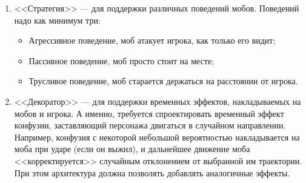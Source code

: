 \documentclass{../../text-style}
\begin{document}
\begin{enumerate}
    \item <<Стратегия>> --- для поддержки различных поведений мобов. Поведений надо как минимум три:
    \begin{itemize}
        \item Агрессивное поведение, моб атакует игрока, как только его видит;
        \item Пассивное поведение, моб просто стоит на месте;
        \item Трусливое поведение, моб старается держаться на расстоянии от игрока.
    \end{itemize}
    \item <<Декоратор>> --- для поддержки временных эффектов, накладываемых на мобов и игрока. А именно, требуется спроектировать временный эффект конфузии, заставляющий персонажа двигаться в случайном направлении. Например, конфузия с некоторой небольшой вероятностью накладывается на моба при ударе (если он выжил), и дальнейшее движение моба <<корректируется>> случайным отклонением от выбранной им траектории. При этом архитектура должна позволять добавлять аналогичные эффекты.
\end{enumerate}
\end{document}
